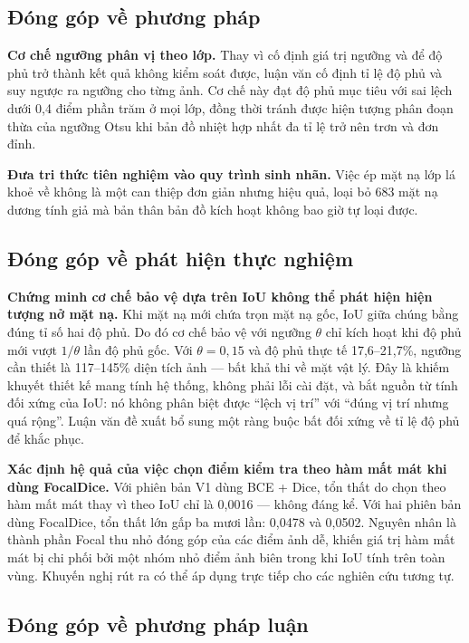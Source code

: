 \subsection{Đóng góp về phương pháp}

\textbf{Cơ chế ngưỡng phân vị theo lớp.} Thay vì cố định giá trị ngưỡng và để độ
phủ trở thành kết quả không kiểm soát được, luận văn cố định tỉ lệ độ phủ và suy
ngược ra ngưỡng cho từng ảnh. Cơ chế này đạt độ phủ mục tiêu với sai lệch dưới 0,4
điểm phần trăm ở mọi lớp, đồng thời tránh được hiện tượng phân đoạn thừa của ngưỡng
Otsu khi bản đồ nhiệt hợp nhất đa tỉ lệ trở nên trơn và đơn đỉnh.

\textbf{Đưa tri thức tiên nghiệm vào quy trình sinh nhãn.} Việc ép mặt nạ lớp lá
khoẻ về không là một can thiệp đơn giản nhưng hiệu quả, loại bỏ 683 mặt nạ dương
tính giả mà bản thân bản đồ kích hoạt không bao giờ tự loại được.

\subsection{Đóng góp về phát hiện thực nghiệm}

\textbf{Chứng minh cơ chế bảo vệ dựa trên IoU không thể phát hiện hiện tượng nở
mặt nạ.} Khi mặt nạ mới chứa trọn mặt nạ gốc, IoU giữa chúng bằng đúng tỉ số hai
độ phủ. Do đó cơ chế bảo vệ với ngưỡng $\theta$ chỉ kích hoạt khi độ phủ mới vượt
$1/\theta$ lần độ phủ gốc. Với $\theta = 0{,}15$ và độ phủ thực tế 17,6--21,7\%,
ngưỡng cần thiết là 117--145\% diện tích ảnh --- bất khả thi về mặt vật lý. Đây là
khiếm khuyết thiết kế mang tính hệ thống, không phải lỗi cài đặt, và bắt nguồn từ
tính đối xứng của IoU: nó không phân biệt được ``lệch vị trí'' với ``đúng vị trí
nhưng quá rộng''. Luận văn đề xuất bổ sung một ràng buộc bất đối xứng về tỉ lệ độ
phủ để khắc phục.

\textbf{Xác định hệ quả của việc chọn điểm kiểm tra theo hàm mất mát khi dùng
FocalDice.} Với phiên bản V1 dùng BCE + Dice, tổn thất do chọn theo hàm mất mát
thay vì theo IoU chỉ là 0,0016 --- không đáng kể. Với hai phiên bản dùng FocalDice,
tổn thất lớn gấp ba mươi lần: 0,0478 và 0,0502. Nguyên nhân là thành phần Focal
thu nhỏ đóng góp của các điểm ảnh dễ, khiến giá trị hàm mất mát bị chi phối bởi
một nhóm nhỏ điểm ảnh biên trong khi IoU tính trên toàn vùng. Khuyến nghị rút ra
có thể áp dụng trực tiếp cho các nghiên cứu tương tự.

\subsection{Đóng góp về phương pháp luận}

